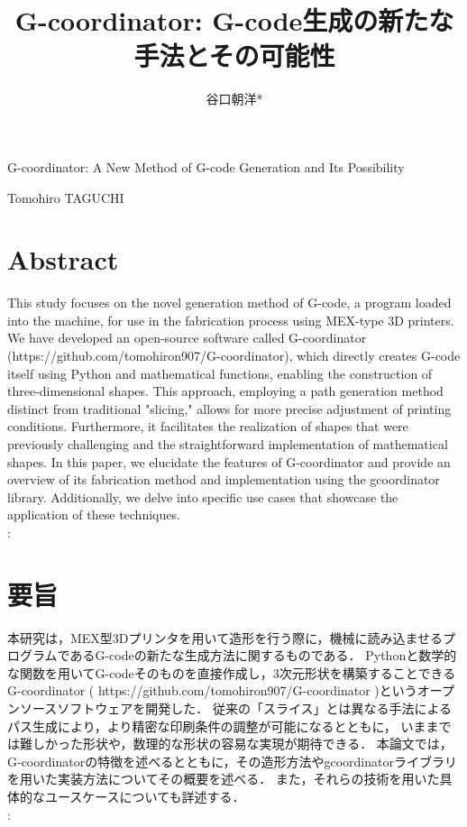 \documentclass{article}
\begin{document}
\title{G-coordinator: G-code生成の新たな手法とその可能性}
\author{谷口朝洋*}
\maketitle

\begin{center}
  \large
  G-coordinator: A New Method of G-code Generation and Its Possibility
  
  Tomohiro TAGUCHI
\end{center}




\section*{Abstract}

This study focuses on the novel generation method of G-code, a program loaded into the machine,
  for use in the fabrication process using MEX-type 3D printers.
  We have developed an open-source software called G-coordinator (https://github.com/tomohiron907/G-coordinator), 
  which directly creates G-code itself using Python and mathematical functions, 
  enabling the construction of three-dimensional shapes. 
  This approach, employing a path generation method distinct from traditional "slicing," 
  allows for more precise adjustment of printing conditions. 
  Furthermore, it facilitates the realization of shapes that were previously challenging and 
  the straightforward implementation of mathematical shapes.
In this paper, we elucidate the features of G-coordinator and provide an overview of its fabrication method 
and implementation using the gcoordinator library. 
Additionally, we delve into specific use cases that showcase the application of these techniques.\\
: 

\section*{要旨}
本研究は，MEX型3Dプリンタを用いて造形を行う際に，機械に読み込ませるプログラムであるG-codeの新たな生成方法に関するものである．
Pythonと数学的な関数を用いてG-codeそのものを直接作成し，3次元形状を構築することできるG-coordinator 
( https://github.com/tomohiron907/G-coordinator )というオープンソースソフトウェアを開発した．
従来の「スライス」とは異なる手法によるパス生成により，より精密な印刷条件の調整が可能になるとともに，
いままでは難しかった形状や，数理的な形状の容易な実現が期待できる．
本論文では，G-coordinatorの特徴を述べるとともに，その造形方法やgcoordinatorライブラリを用いた実装方法についてその概要を述べる．
また，それらの技術を用いた具体的なユースケースについても詳述する．\\
: 
\end{document}
